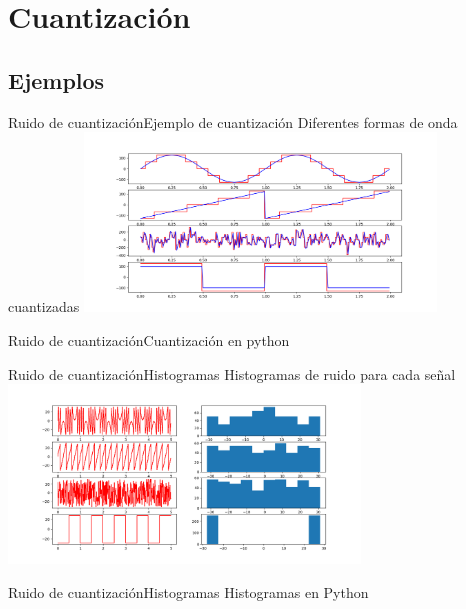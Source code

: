  \section{Cuantización}
 \subsection{Ejemplos}
 \begin{frame}{Ruido de cuantización}{Ejemplo de cuantización}
    Diferentes formas de onda cuantizadas
    \center\includegraphics[width=0.7\textwidth]{1_clase/noise_examples}
    \vfill
 \end{frame}
 \begin{frame}{Ruido de cuantización}{Cuantización en python}
    \handsonicon
    
    \vfill
 \end{frame}
 \begin{frame}{Ruido de cuantización}{Histogramas}
    Histogramas de ruido para cada señal
    \center\includegraphics[width=0.7\textwidth]{1_clase/noise_histogram}
    \vfill
 \end{frame}
 \begin{frame}{Ruido de cuantización}{Histogramas}
    Histogramas en Python
    \handsonicon
    
    \vfill
 \end{frame}
